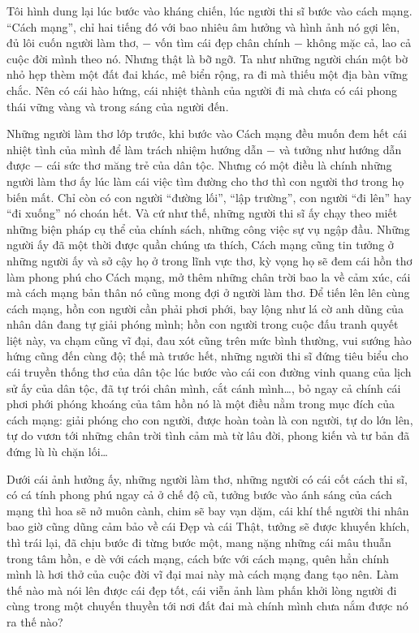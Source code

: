 \documentclass[../main.tex]{subfiles}
\begin{document}
\begin{multicols}{2}
Tôi hình dung lại lúc bước vào kháng chiến, lúc người thi sĩ bước vào cách mạng. “Cách mạng”, chỉ hai tiếng đó với bao nhiêu âm hưởng và hình ảnh nó gợi lên, đủ lôi cuốn người làm thơ, − vốn tìm cái đẹp chân chính − không mặc cả, lao cả cuộc đời mình theo nó. Nhưng thật là bỡ ngỡ. Ta như những người chán một bờ nhỏ hẹp thèm một đất đai khác, mê biển rộng, ra đi mà thiếu một địa bàn vững chắc. Nên có cái hào hứng, cái nhiệt thành của người đi mà chưa có cái phong thái vững vàng và trong sáng của người đến.  
 
Những người làm thơ lớp trước, khi bước vào Cách mạng đều muốn đem hết cái nhiệt tình của mình để làm trách nhiệm hướng dẫn − và tưởng như hướng dẫn được − cái sức thơ măng trẻ của dân tộc. Nhưng có một điều là chính những người làm thơ ấy lúc làm cái việc tìm đường cho thơ thì con người thơ trong họ biến mất. Chỉ còn có con người “đường lối”, “lập trường”, con người “đi lên” hay “đi xuống” nó choán hết. Và cứ như thế, những người thi sĩ ấy chạy theo miết những biện pháp cụ thể của chính sách, những công việc sự vụ ngập đầu. Những người ấy đã một thời được quần chúng ưa thích, Cách mạng cũng tin tưởng ở những người ấy và sở cậy họ ở trong lĩnh vực thơ, kỳ vọng họ sẽ đem cái hồn thơ làm phong phú cho Cách mạng, mở thêm những chân trời bao la về cảm xúc, cái mà cách mạng bản thân nó cũng mong đợi ở người làm thơ. Để tiến lên lên cùng cách mạng, hồn con người cần phải phơi phới, bay lộng như lá cờ anh dũng của nhân dân đang tự giải phóng mình; hồn con người trong cuộc đấu tranh quyết liệt này, va chạm cũng vĩ đại, đau xót cũng trên mức bình thường, vui sướng hào hứng cũng đến cùng độ; thế mà trước hết, những người thi sĩ đứng tiêu biểu cho cái truyền thống thơ của dân tộc lúc bước vào cái con đường vinh quang của lịch sử ấy của dân tộc, đã tự trói chân mình, cắt cánh mình…, bỏ ngay cả chính cái phơi phới phóng khoáng của tâm hồn nó là một điều nằm trong mục đích của cách mạng: giải phóng cho con người, được hoàn toàn là con người, tự do lớn lên, tự do vươn tới những chân trời tình cảm mà từ lâu đời, phong kiến và tư bản đã đứng lù lù chặn lối… 
 
Dưới cái ảnh hưởng ấy, những người làm thơ, những người có cái cốt cách thi sĩ, có cá tính phong phú ngay cả ở chế độ cũ, tưởng bước vào ánh sáng của cách mạng thì hoa sẽ nở muôn cành, chim sẽ bay vạn dặm, cái khí thế người thi nhân bao giờ cũng dũng cảm bảo về cái Đẹp và cái Thật, tưởng sẽ được khuyến khích, thì trái lại, đã chịu bước đi từng bước một, mang nặng những cái mâu thuẫn trong tâm hồn, e dè với cách mạng, cách bức với cách mạng, quên hẳn chính mình là hơi thở của cuộc đời vĩ đại mai này mà cách mạng đang tạo nên. Làm thế nào mà nói lên được cái đẹp tốt, cái viễn ảnh làm phấn khởi lòng người đi cùng trong một chuyến thuyền tới nơi đất đai mà chính mình chưa nắm được nó ra thế nào? 
 

\end{multicols}
\end{document}
